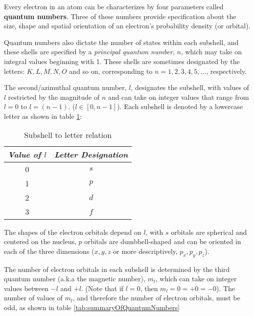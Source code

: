 \documentclass{article}
\begin{document}
Every electron in an atom can be characterizes by four parameters called \textbf{quantum numbers}. Three of these numbers provide specification about the size, shape and spatial orientation of an electron's probability density (or orbital). 

Quantum numbers also dictate the number of states within each subshell, and these shells are specified by a \textit{principal quantum number}, $n$, which may take on integral values beginning with 1. These shells are sometimes designated by the letters: $K, L, M, N, O$ and so on, corresponding to $n = 1,2,3,4,5, \dots$, respectively.

The second/azimuthal quantum number, $l$, designates the subshell, with values of $l$ restricted by the magnitude of $n$ and can take on integer values that range from $l=0$ to $l=(n-1)$. ($l \in [0, n-1]$). Each subshell is denoted by a lowercase letter as shown in table \ref{tab:lToLetter}:

\begin{table}[]
    \centering
    \begin{tabular}{|c|c|}
        \hline
         \textit{Value of $l$} & \textit{Letter Designation} \\
         \hline
         0 & $s$ \\
         1 & $p$ \\ 
         2 & $d$ \\ 
         3 & $f$ \\
         \hline
    \end{tabular}
    \caption{Subshell to letter relation}
    \label{tab:lToLetter}
\end{table}

The shapes of the electron orbitals depend on $l$, with $s$ orbitals are spherical and centered on the nucleus, $p$ orbitals are dumbbell-shaped and can be oriented in each of the three dimensions ($x,y,z$ or more descriptively, $p_x, p_y, p_z$).

The number of electron orbitals in each subshell is determined by the third quantum number (a.k.a the magnetic number), $m_l$, which can take on integer values between $-l$ and $+l$. (Note that if $l=0$, then $m_l=0=+0=-0$). The number of values of $m_l$, and therefore the number of electron orbitals, must be odd, as shown in table \ref{tab:summaryOfQuantumNumbers}
\end{document}
